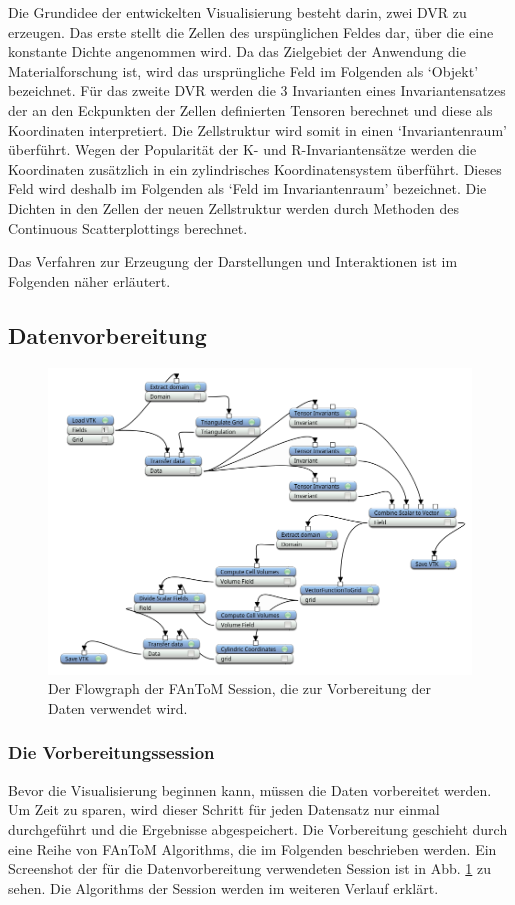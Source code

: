 \documentclass[a4paper,fontsize=12pt,toc=bib,halfparskip]{scrartcl}
\begin{document}
Die Grundidee der entwickelten Visualisierung besteht darin, zwei DVR zu erzeugen. Das erste stellt die Zellen des ursp\"unglichen Feldes dar, \"uber die eine konstante Dichte angenommen wird. Da das Zielgebiet der Anwendung die Materialforschung ist, wird das urspr\"ungliche Feld im Folgenden als `Objekt' bezeichnet. F\"ur das zweite DVR werden die 3 Invarianten eines Invariantensatzes der an den Eckpunkten der Zellen definierten Tensoren berechnet und diese als Koordinaten interpretiert. Die Zellstruktur wird somit in einen `Invariantenraum' \"uberf\"uhrt. Wegen der Popularit\"at der K- und R-Invariantens\"atze werden die Koordinaten zus\"atzlich in ein zylindrisches Koordinatensystem \"uberf\"uhrt. Dieses Feld wird deshalb im Folgenden als `Feld im Invariantenraum' bezeichnet. Die Dichten in den Zellen der neuen Zellstruktur werden durch Methoden des Continuous Scatterplottings berechnet.

Das Verfahren zur Erzeugung der Darstellungen und Interaktionen ist im Folgenden n\"aher erl\"autert.

\subsection{Datenvorbereitung}
\begin{figure}
	\centering
	\includegraphics[width=\textwidth]{pictures/BigSession.png}
	\caption{Der Flowgraph der FAnToM Session, die zur Vorbereitung der Daten verwendet wird.}
	\label{BigSession}
\end{figure}
\subsubsection{Die Vorbereitungssession}
Bevor die Visualisierung beginnen kann, m\"ussen die Daten vorbereitet werden. Um Zeit zu sparen, wird dieser Schritt f\"ur jeden Datensatz nur einmal durchgef\"uhrt und die Ergebnisse abgespeichert. Die Vorbereitung geschieht durch eine Reihe von FAnToM Algorithms, die im Folgenden beschrieben werden. Ein Screenshot der f\"ur die Datenvorbereitung verwendeten Session ist in Abb. \ref{BigSession} zu sehen. Die Algorithms der Session werden im weiteren Verlauf erkl\"art.
\end{document}
